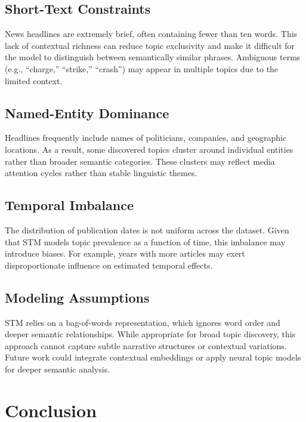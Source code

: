 \documentclass[11pt]{article}
\begin{document}
\subsection{Short-Text Constraints}

News headlines are extremely brief, often containing fewer than ten words. This lack of contextual richness can reduce topic exclusivity and make it difficult for the model to distinguish between semantically similar phrases. Ambiguous terms (e.g., ``charge,'' ``strike,'' ``crash'') may appear in multiple topics due to the limited context.

\subsection{Named-Entity Dominance}

Headlines frequently include names of politicians, companies, and geographic locations. As a result, some discovered topics cluster around individual entities rather than broader semantic categories. These clusters may reflect media attention cycles rather than stable linguistic themes.

\subsection{Temporal Imbalance}

The distribution of publication dates is not uniform across the dataset. Given that STM models topic prevalence as a function of time, this imbalance may introduce biases. For example, years with more articles may exert disproportionate influence on estimated temporal effects.

\subsection{Modeling Assumptions}

STM relies on a bag-of-words representation, which ignores word order and deeper semantic relationships. While appropriate for broad topic discovery, this approach cannot capture subtle narrative structures or contextual variations. Future work could integrate contextual embeddings or apply neural topic models for deeper semantic analysis.

\section{Conclusion}
\end{document}
